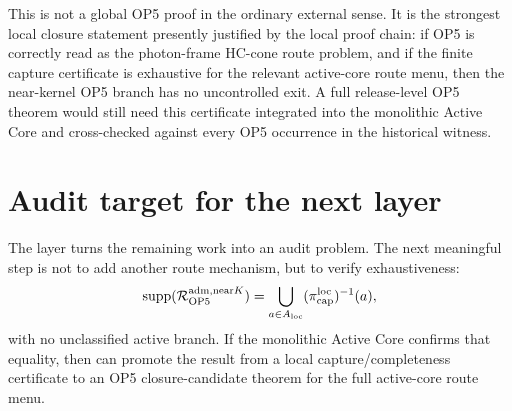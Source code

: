 \begin{remark}[No overclaim]
This is not a global OP5 proof in the ordinary external sense. It is the strongest local closure statement presently justified by the local proof chain: if OP5 is correctly read as the photon-frame HC-cone route problem, and if the finite capture certificate is exhaustive for the relevant active-core route menu, then the near-kernel OP5 branch has no uncontrolled exit. A full release-level OP5 theorem would still need this certificate integrated into the monolithic Active Core and cross-checked against every OP5 occurrence in the historical witness.
\end{remark}

\section{Audit target for the next layer}

The layer turns the remaining work into an audit problem. The next meaningful step is not to add another route mechanism, but to verify exhaustiveness:
\[
\operatorname{supp}(\mathcal R_{\mathrm{OP} 5}^{\mathrm{adm},\mathrm{near} K})
=
\bigcup_{a\in A_{\mathrm{loc}}}(\pi_{\mathrm{cap}}^{\mathrm{loc}})^{-1}(a),
\]
with no unclassified active branch. If the monolithic Active Core confirms that equality, then can promote the result from a local capture/completeness certificate to an OP5 closure-candidate theorem for the full active-core route menu.



\clearpage
